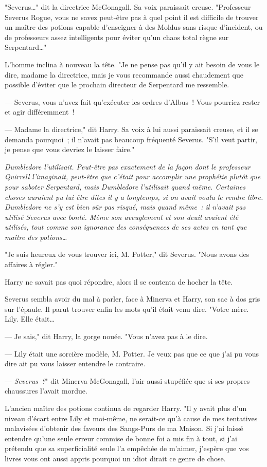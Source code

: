 "Severus…" dit la directrice McGonagall. Sa voix paraissait creuse. "Professeur Severus Rogue, vous ne savez peut-être pas à quel point il est difficile de trouver un maître des potions capable d'enseigner à des Moldus sans risque d'incident, ou de professeurs assez intelligents pour éviter qu'un chaos total règne sur Serpentard…"

L'homme inclina à nouveau la tête. "Je ne pense pas qu'il y ait besoin de vous le dire, madame la directrice, mais je vous recommande aussi chaudement que possible d'éviter que le prochain directeur de Serpentard me ressemble.

--- Severus, vous n'avez fait qu'exécuter les ordres d'Albus~! Vous pourriez rester et agir différemment~!

--- Madame la directrice," dit Harry. Sa voix à lui aussi paraissait creuse, et il se demanda pourquoi~; il n'avait pas beaucoup fréquenté Severus. "S'il veut partir, je pense que vous devriez le laisser faire."

\emph{Dumbledore l'utilisait. Peut-être pas exactement de la façon dont le professeur Quirrell l'imaginait, peut-être que c'était pour accomplir une prophétie plutôt que pour saboter Serpentard, mais Dumbledore l'utilisait quand même. Certaines choses auraient pu lui être dites il y a longtemps, si on avait voulu le rendre libre. Dumbledore ne s'y est bien sûr pas risqué, mais quand même~: il n'avait pas utilisé Severus avec bonté. Même son aveuglement et son deuil avaient été utilisés, tout comme son ignorance des conséquences de ses actes en tant que maître des potions…}

"Je suis heureux de vous trouver ici, M. Potter," dit Severus. "Nous avons des affaires à régler."

Harry ne savait pas quoi répondre, alors il se contenta de hocher la tête.

Severus sembla avoir du mal à parler, face à Minerva et Harry, son sac à dos gris sur l'épaule. Il parut trouver enfin les mots qu'il était venu dire. "Votre mère. Lily. Elle était…

--- Je sais," dit Harry, la gorge nouée. "Vous n'avez pas à le dire.

--- Lily était une sorcière modèle, M. Potter. Je veux pas que ce que j'ai pu vous dire ait pu vous laisser entendre le contraire.

--- \emph{Severus~?}" dit Minerva McGonagall, l'air aussi stupéfiée que si ses propres chaussures l'avait mordue.

L'ancien maître des potions continua de regarder Harry. "Il y avait plus d'un niveau d'écart entre Lily et moi-même, ne serait-ce qu'à cause de mes tentatives malavisées d'obtenir des faveurs des Sangs-Purs de ma Maison. Si j'ai laissé entendre qu'une seule erreur commise de bonne foi a mis fin à tout, si j'ai prétendu que sa superficialité seule l'a empêchée de m'aimer, j'espère que vos livres vous ont aussi appris pourquoi un idiot dirait ce genre de chose.

